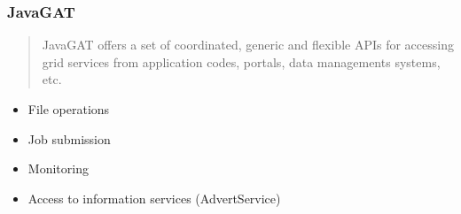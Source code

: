 \documentclass{beamer}
\begin{document}
\frame
{
	\frametitle{JavaGAT}
	\begin{quote}
		JavaGAT offers a set of coordinated, generic and flexible APIs for accessing
		grid services from application codes, portals, data managements systems, etc.
	\end{quote}
	
	\begin{itemize}
		\item File operations
		\item Job submission
		\item Monitoring
		\item Access to information services (AdvertService)
	\end{itemize}
}


\end{document}
